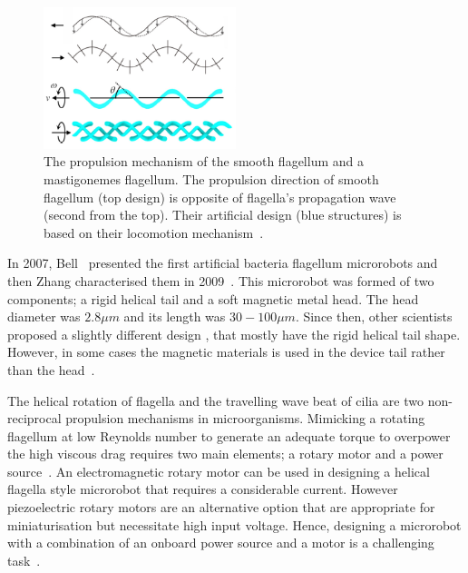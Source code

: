 \documentclass[12pt,a4paper,titlepage]{report}
\begin{document}
\begin{figure}
  \begin{center}
    \includegraphics[width=0.5\textwidth]{10}
  \caption{ The propulsion mechanism of the smooth flagellum and a mastigonemes flagellum.
The propulsion direction of smooth flagellum (top design) is opposite of flagella\rq{}s propagation 
wave (second from the top). Their artificial design (blue structures) is based on 
their locomotion mechanism~\citep{gao2013bioinspired}.}
  \label{10}
\end{center}
\end{figure}

In 2007, Bell~\citep{gao2013bioinspired} presented the first artificial bacteria flagellum microrobots and then
 Zhang characterised them in 2009~\citep{gao2013bioinspired}. This microrobot was formed of two 
components; a rigid helical tail and a soft magnetic metal head. The head diameter 
was $2.8 \mu  m$ and its length was $30-100 \mu m$. Since then, other scientists proposed a slightly different design 
, that mostly have the rigid helical tail shape. However, in some cases the magnetic
 materials is used in the device tail rather than the head~\citep{gao2013bioinspired}. 


The helical rotation of flagella and the travelling wave beat of cilia are two non-reciprocal propulsion
 mechanisms in microorganisms. Mimicking a rotating flagellum at low Reynolds number to generate an 
adequate torque to overpower the high viscous drag requires two main elements; a rotary motor and a
 power source~\citep{qiunanohelices}. 
An electromagnetic rotary motor can be used in designing a helical flagella style microrobot that 
requires a considerable current. However piezoelectric rotary motors are an alternative option 
that are appropriate for miniaturisation but necessitate high input voltage.  Hence, designing a microrobot with a 
combination of an onboard power source and a motor is a challenging task~\citep{qiunanohelices}.
\end{document}
